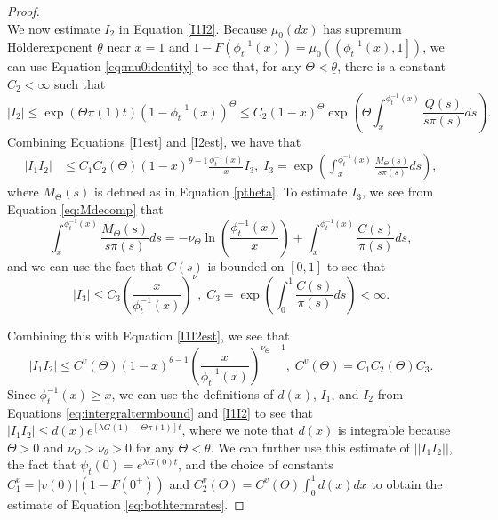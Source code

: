 \documentclass[11pt]{article}
\numberwithin{equation}{section}
\newcommand{\holder}{H{\"o}lder\:}
\newcommand{\paren}[1]{\left(#1\right)}
\newcommand{\abs}[1]{\left\lvert #1 \right\rvert}
\begin{document}
{\begin{proof}
\begin{equation}
\end{equation}
We  now estimate $I_2$ in Equation \eqref{I1I2}. Because $\mu_0(dx)$ has supremum \holder exponent $\underline{\theta}$ near $x=1$ and $1-F(\phi_t^{-1}(x)) = \mu_0\left(\left(\phi_t^{-1}(x),1\right]\right)$, we can use Equation \eqref{eq:mu0identity} to see that, for any $\Theta < \underline{\theta}$, there is a constant $C_2 < \infty$ such that
\begin{equation} \label{I2est}
\abs{I_2}\leq \exp(\Theta \pi(1)t) (1-\phi_t^{-1}(x))^\Theta \leq 
C_2(1-x)^\Theta \exp\paren{\Theta \int_x^{\phi_t^{-1}(x)}\frac{Q(s)}{s\pi(s)}ds}.%
\end{equation}
Combining Equations \eqref{I1est} and \eqref{I2est}, we have that
\begin{equation}\label{I1I2est}
\begin{split}
\abs{I_1I_2}&\leq C_1C_2(\Theta)(1-x)^{\theta-1}\frac{\phi_t^{-1}(x)}{x}I_3,\; I_3=\exp\paren{\int_x^{\phi_t^{-1}(x)}\frac{M_{\Theta}(s)}{s\pi(s)}ds},
\end{split}
\end{equation}
where $M_{\Theta}(s)$ is defined as in Equation \eqref{ptheta}.
To estimate $I_3$, we see from Equation \eqref{eq:Mdecomp} that
\begin{equation}
\int_x^{\phi_t^{-1}(x)}\frac{M_{\Theta}(s)}{s\pi(s)}ds =-\nu_{\Theta} \ln\paren{\frac{\phi_t^{-1}(x)}{x}}+\int_x^{\phi_t^{-1}(x)}\frac{C(s)}{\pi(s)}ds,
\end{equation}
and we can use the fact that $C(s)$ is bounded on $[0,1]$ to see that 
\begin{equation}
\abs{I_3}\leq C_3 \paren{\frac{x}{\phi_t^{-1}(x)}}^\nu, \; C_3=\exp\paren{\int_0^1\frac{C(s)}{\pi(s)}ds} < \infty.
\end{equation}

Combining this with Equation \eqref{I1I2est}, we see that
\begin{equation}
\abs{I_1I_2}\leq C^{v}(\Theta)(1-x)^{\theta-1}\paren{\frac{x}{\phi_t^{-1}(x)}}^{\nu_{\Theta}-1}, \; C^{v}(\Theta)=C_1C_2(\Theta)C_3.
\end{equation}
Since $\phi_t^{-1}(x)\geq x$, we can use the definitions of $d(x)$, $I_1$, and $I_2$ from Equations \eqref{eq:intergraltermbound} and \eqref{I1I2} to see that $\abs{I_1I_2} \leq d(x) e^{\left[\lambda G(1) - \Theta \pi(1) \right] t}$, where we note that $d(x)$ is integrable because $\Theta > 0$ and $\nu_{\Theta} > \nu_{\theta} > 0$ for any $\Theta < \theta$. We can further use this estimate of  $|\abs{I_1I_2}|$, the fact that $\psi_t(0) = e^{\lambda G(0) t}$, and the choice of constants $C_1^v = |v(0)| (1 - F(0^+))$ and $C_2^v(\Theta) = C^v(\Theta) \int_0^1 d(x) dx$ to obtain the estimate of Equation \eqref{eq:bothtermrates}.
\end{proof}


}
\end{document}

